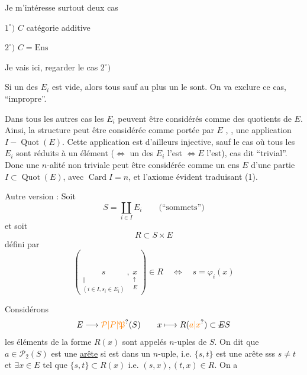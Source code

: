\margin{[\, Les $n$-alités forment une catégorie $n$-al$(C)$, fibrée sur le groupoïde \deleted{\unsure{Ens}}\unsure{$\mathcal S_n$|$\mathrm{Ens}_n$}}

Je m'intéresse surtout  deux cas

$1^\circ)$ $C$ catégorie additive

$2^\circ)$ $C=\mathrm{Ens}$

 Je vais ici, regarder le cas $2^\circ)$

Si un des $E_i$ est vide, alors  tous sauf au plus
un le sont. On va exclure ce cas,  ``impropre''.

Dans tous les autres cas les $E_i$ peuvent
être considérés comme des quotients de $E$.
Ainsi, la structure peut être considérée comme
portée par $E$\deleted{\unsure{,}} , , une
application $I\mathrel{-}\operatorname{Quot}(E)$. Cette application
est d'ailleurs injective, sauf 
le cas où tous les $E_i$ sont réduits à un
élément  ($\Leftrightarrow$  un des $E_i$ l'est $\Leftrightarrow E$ l'est),
cas dit ``trivial''. Donc une $n$-alité non
triviale peut être considérée comme
un ens $E$  d'une partie
$I\subset\operatorname{Quot}(E)$, avec $\operatorname{Card} I=n$, et 
l'axiome évident traduisant (1).

Autre version : Soit 
\[
S=\coprod_{i\in I}E_i\qquad\text{(``sommets'')}
\tag*{(2)}
\]
et  soit
\[
R\subset S\times E \tag*{(3)}
\]
défini par
\[
(\underset{\substack{\Vert\\(i\in I,s_i\in E_i)}}{s},
 \underset{\substack{\uparrow\\E}}{x})\in R\quad\Longleftrightarrow\quad
s=\varphi_i(x)
\]


Considérons
\[
E\longrightarrow \unsure{\mathcal P|P|\mathfrak P}(S)\qquad x\longmapsto R(\unsure{a|x})\subset\deleted{E}S
\]
les éléments de  la forme $R(x)$ sont
appelés $n$-uples de $S$. On dit que
$a\in\mathcal P_2(S)$ est une \uline{arête} si  est 
dans un $n$-uple, i.e. $\{s,t\}$ est une arête
sss $s\ne t$ et $\exists x\in E$ tel que $\{s,t\}\subset R(x)$ i.e.
$(s,x),(t,x)\in R$. On a

